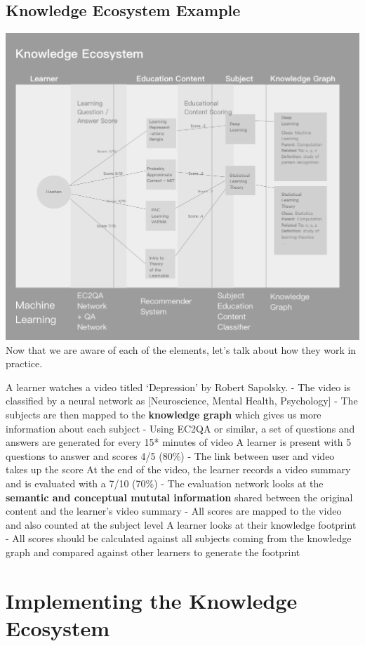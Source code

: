 \documentclass{acm_proc_article-sp}
\begin{document}
\subsection{Knowledge Ecosystem
Example}\label{knowledge-ecosystem-example-1}

\includegraphics{img/knowledgeEcosystem.png} Now that we are aware of
each of the elements, let's talk about how they work in practice.

A learner watches a video titled `Depression' by Robert Sapolsky. - The
video is classified by a neural network as {[}Neuroscience, Mental
Health, Psychology{]} - The subjects are then mapped to the
\textbf{knowledge graph} which gives us more information about each
subject - Using EC2QA or similar, a set of questions and answers are
generated for every 15* minutes of video A learner is present with 5
questions to answer and scores 4/5 (80\%) - The link between user and
video takes up the score At the end of the video, the learner records a
video summary and is evaluated with a 7/10 (70\%) - The evaluation
network looks at the \textbf{semantic and conceptual mututal
information} shared between the original content and the learner's video
summary - All scores are mapped to the video and also counted at the
subject level A learner looks at their knowledge footprint - All scores
should be calculated against all subjects coming from the knowledge
graph and compared against other learners to generate the footprint

\section{Implementing the Knowledge
Ecosystem}\label{implementing-the-knowledge-ecosystem}
\end{document}
